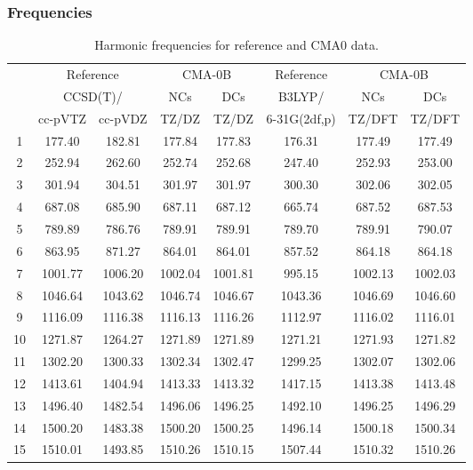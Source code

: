 \documentclass[10pt,oneside]{article}
\begin{document}
\subsubsection*{Frequencies}
\begin{table}[h!]
\centering
\caption{Harmonic frequencies for reference and CMA0 data.}
\begin{tabular}{cccccccc}
\toprule
{} & \multicolumn{2}{c}{Reference} & \multicolumn{2}{c}{CMA-0B} &    Reference & \multicolumn{2}{c}{CMA-0B} \\
{} & \multicolumn{2}{c}{CCSD(T)/} &     NCs &     DCs &       B3LYP/ &     NCs &     DCs \\
{} &   cc-pVTZ & cc-pVDZ &   TZ/DZ &   TZ/DZ & 6-31G(2df,p) &  TZ/DFT &  TZ/DFT \\
\midrule
1  &    177.40 &  182.81 &  177.84 &  177.83 &       176.31 &  177.49 &  177.49 \\
2  &    252.94 &  262.60 &  252.74 &  252.68 &       247.40 &  252.93 &  253.00 \\
3  &    301.94 &  304.51 &  301.97 &  301.97 &       300.30 &  302.06 &  302.05 \\
4  &    687.08 &  685.90 &  687.11 &  687.12 &       665.74 &  687.52 &  687.53 \\
5  &    789.89 &  786.76 &  789.91 &  789.91 &       789.70 &  789.91 &  790.07 \\
6  &    863.95 &  871.27 &  864.01 &  864.01 &       857.52 &  864.18 &  864.18 \\
7  &   1001.77 & 1006.20 & 1002.04 & 1001.81 &       995.15 & 1002.13 & 1002.03 \\
8  &   1046.64 & 1043.62 & 1046.74 & 1046.67 &      1043.36 & 1046.69 & 1046.60 \\
9  &   1116.09 & 1116.38 & 1116.13 & 1116.26 &      1112.97 & 1116.02 & 1116.01 \\
10 &   1271.87 & 1264.27 & 1271.89 & 1271.89 &      1271.21 & 1271.93 & 1271.82 \\
11 &   1302.20 & 1300.33 & 1302.34 & 1302.47 &      1299.25 & 1302.07 & 1302.06 \\
12 &   1413.61 & 1404.94 & 1413.33 & 1413.32 &      1417.15 & 1413.38 & 1413.48 \\
13 &   1496.40 & 1482.54 & 1496.06 & 1496.25 &      1492.10 & 1496.25 & 1496.29 \\
14 &   1500.20 & 1483.38 & 1500.20 & 1500.25 &      1496.14 & 1500.18 & 1500.34 \\
15 &   1510.01 & 1493.85 & 1510.26 & 1510.15 &      1507.44 & 1510.32 & 1510.26 \\

\end{tabular}
\end{table}
\end{document}
